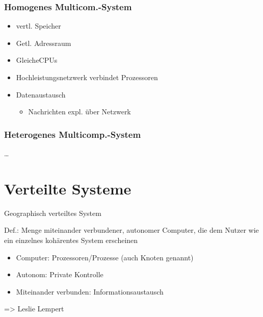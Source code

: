\subsubsection{Homogenes Multicom.-System}
\begin{itemize}
	\item vertl. Speicher
	\item Getl. Adressraum
	\item GleicheCPUs
	\item Hochleistungsnetzwerk verbindet Prozessoren
	\item Datenaustausch
		\begin{itemize}
			\item Nachrichten expl. über Netzwerk
		\end{itemize}

\end{itemize}

\subsubsection{Heterogenes Multicomp.-System}
\ldots


\section{Verteilte Systeme}
Geographisch verteiltes System

Def.: Menge miteinander verbundener, autonomer Computer, die dem Nutzer wie ein einzelnes kohärentes System erscheinen
\begin{itemize}
	\item Computer: Prozessoren/Prozesse (auch Knoten genannt)
	\item Autonom: Private Kontrolle
	\item Miteinander verbunden: Informationsaustausch
\end{itemize}

=> Leslie Lempert

